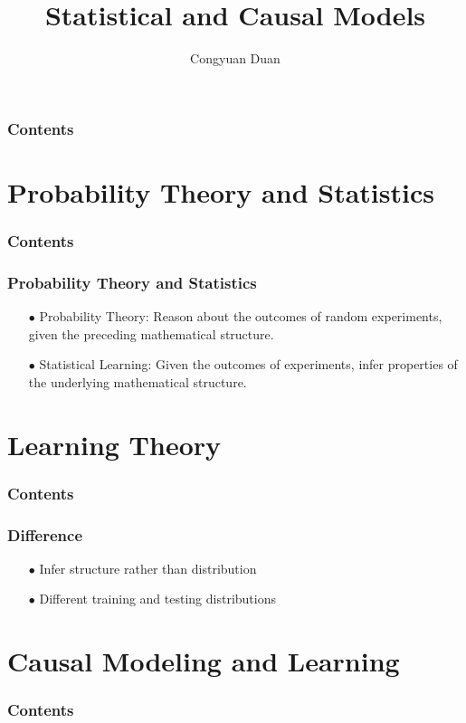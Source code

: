 \documentclass{beamer}
\title{Statistical and Causal Models}
\author{Congyuan Duan}
\begin{document}
\frame{\titlepage}

\begin{frame}
    \frametitle{Contents}
    \tableofcontents
\end{frame}

\section{Probability Theory and Statistics}

\begin{frame}
    \frametitle{Contents}
    \tableofcontents[currentsection]
\end{frame}

\begin{frame}
    \frametitle{Probability Theory and Statistics}
    \begin{itemize}
        \item[$\bullet$]Probability Theory: Reason about the outcomes of random
        experiments, given the preceding mathematical structure.
        \item[$\bullet$]Statistical Learning: Given the outcomes of experiments, 
        infer properties of the underlying mathematical structure.
    \end{itemize}
\end{frame}

\section{Learning Theory}

\begin{frame}
    \frametitle{Contents}
    \tableofcontents[currentsection]
\end{frame}

\begin{frame}
    \frametitle{Difference}
    \begin{itemize}
        \item[$\bullet$]Infer structure rather than distribution
        \item[$\bullet$]Different training and testing distributions
    \end{itemize}
\end{frame}

\section{Causal Modeling and Learning}

\begin{frame}
    \frametitle{Contents}
    \tableofcontents[currentsection]
\end{frame}
\end{document}
